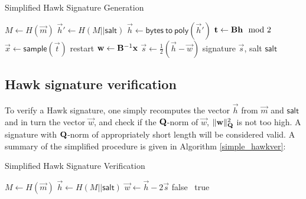 \begin{algorithm}
    \caption{Simplified Hawk Signature Generation}\label{simple_hawksign}
\begin{algorithmic}[1]
    \State $M \gets H(\vec{m})$ 
    \State $\vec{h}' \gets H(M || \mathsf{salt})$ 
    \State $\vec{h} \gets \mathsf{bytes \ to \ poly}(\vec{h}')$
    \State $\mathbf{t} \gets \mathbf{B} \mathbf{h} \mod 2$ 
    \State $\vec{x} \gets \mathsf{sample}(\vec{t})$
    \State restart
    \Else
    \State $\mathbf{w} \gets \mathbf{B}^{-1} \mathbf{x}$
    \State $\vec{s} \gets \frac{1}{2}(\vec{h} - \vec{w})$
    \State \Return signature $\vec{s}$, salt $\mathsf{salt}$
    \EndIf
\end{algorithmic}
\end{algorithm}


\subsection{Hawk signature verification}
To verify a Hawk signature, one simply recomputes the vector $\vec{h}$ from $\vec{m}$ and $\mathsf{salt}$ and in turn the vector $\vec{w}$, and check if the $\mathbf{Q}$-norm of $\vec{w}$,
$\lVert \mathbf{w} \rVert_{\mathbf{Q}}^2$ is not too high. A signature with $\mathbf{Q}$-norm of appropriately short length will be considered valid.
A summary of the simplified procedure is given in Algorithm \ref{simple_hawkver}:

\begin{algorithm}[H]
    \caption{Simplified Hawk Signature Verification}\label{simple_hawkver}
\begin{algorithmic}[1]
    \State $M \gets H(\vec{m})$ 
    \State $\vec{h} \gets H(M || \mathsf{salt})$
    \State $\vec{w} \gets \vec{h} - 2\vec{s}$
    \State \Return false
    \Else \ \Return true
    \EndIf
\end{algorithmic}
\end{algorithm}

